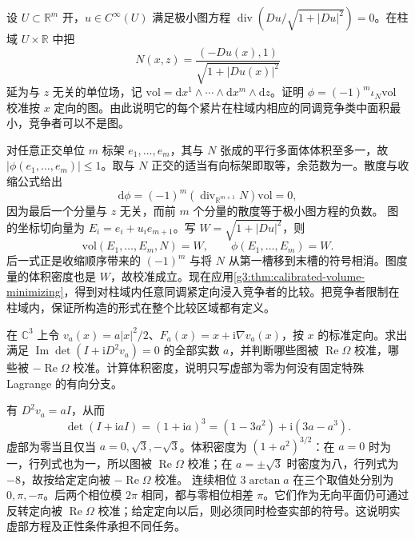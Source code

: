 \begin{exercise}\label{g3:ex:minimal-graph-calibration}
	设 \(U\subset\mathbb R^m\) 开，\(u\in C^\infty(U)\) 满足极小图方程 \(\operatorname{div}(Du/\sqrt{1+|Du|^2})=0\)。在柱域 \(U\times\mathbb R\) 中把
	\[
		N(x,z)=\frac{(-Du(x),1)}{\sqrt{1+|Du(x)|^2}}
	\]
	延为与 \(z\) 无关的单位场，记 \(\mathrm{vol}=\mathrm dx^1\wedge\cdots\wedge\mathrm dx^m\wedge\mathrm dz\)。证明 \(\phi=(-1)^m\iota_N\mathrm{vol}\) 校准按 \(x\) 定向的图。由此说明它的每个紧片在柱域内相应的同调竞争类中面积最小，竞争者可以不是图。
\end{exercise}
\begin{solution}
	对任意正交单位 \(m\) 标架 \(e_1,\ldots,e_m\)，其与 \(N\) 张成的平行多面体体积至多一，故 \(|\phi(e_1,\ldots,e_m)|\le1\)。取与 \(N\) 正交的适当有向标架即取等，余范数为一。散度与收缩公式给出
	\[
		\mathrm d\phi=(-1)^m(\operatorname{div}_{\mathbb R^{m+1}}N)\mathrm{vol}=0,
	\]
	因为最后一个分量与 \(z\) 无关，而前 \(m\) 个分量的散度等于极小图方程的负数。
	图的坐标切向量为 \(E_i=e_i+u_i e_{m+1}\)。写 \(W=\sqrt{1+|Du|^2}\)，则
	\[
		\mathrm{vol}(E_1,\ldots,E_m,N)=W,
		\qquad \phi(E_1,\ldots,E_m)=W.
	\]
	后一式正是收缩顺序带来的 \((-1)^m\) 与将 \(N\) 从第一槽移到末槽的符号相消。图度量的体积密度也是 \(W\)，故校准成立。现在应用\cref{g3:thm:calibrated-volume-minimizing}，得到对柱域内任意同调紧定向浸入竞争者的比较。把竞争者限制在柱域内，保证所构造的形式在整个比较区域都有定义。
\end{solution}

\begin{exercise}\label{g3:ex:special-lagrangian-branch-sign}
	在 \(\mathbb C^3\) 上令 \(v_a(x)=a|x|^2/2\)、\(F_a(x)=x+\mathrm i\nabla v_a(x)\)，按 \(x\) 的标准定向。求出满足 \(\operatorname{Im}\det(I+\mathrm iD^2v_a)=0\) 的全部实数 \(a\)，并判断哪些图被 \(\operatorname{Re}\Omega\) 校准，哪些被 \(-\operatorname{Re}\Omega\) 校准。计算体积密度，说明只写虚部为零为何没有固定特殊 Lagrange 的有向分支。
\end{exercise}
\begin{solution}
	有 \(D^2v_a=aI\)，从而
	\[
		\det(I+\mathrm iaI)=(1+\mathrm ia)^3
		=(1-3a^2)+\mathrm i(3a-a^3).
	\]
	虚部为零当且仅当 \(a=0,\sqrt3,-\sqrt3\)。体积密度为 \((1+a^2)^{3/2}\)：在 \(a=0\) 时为一，行列式也为一，所以图被 \(\operatorname{Re}\Omega\) 校准；在 \(a=\pm\sqrt3\) 时密度为八，行列式为 \(-8\)，故按给定定向被 \(-\operatorname{Re}\Omega\) 校准。
	连续相位 \(3\arctan a\) 在三个取值处分别为 \(0,\pi,-\pi\)。后两个相位模 \(2\pi\) 相同，都与零相位相差 \(\pi\)。它们作为无向平面仍可通过反转定向被 \(\operatorname{Re}\Omega\) 校准；给定定向以后，则必须同时检查实部的符号。这说明实虚部方程及正性条件承担不同任务。
\end{solution}

